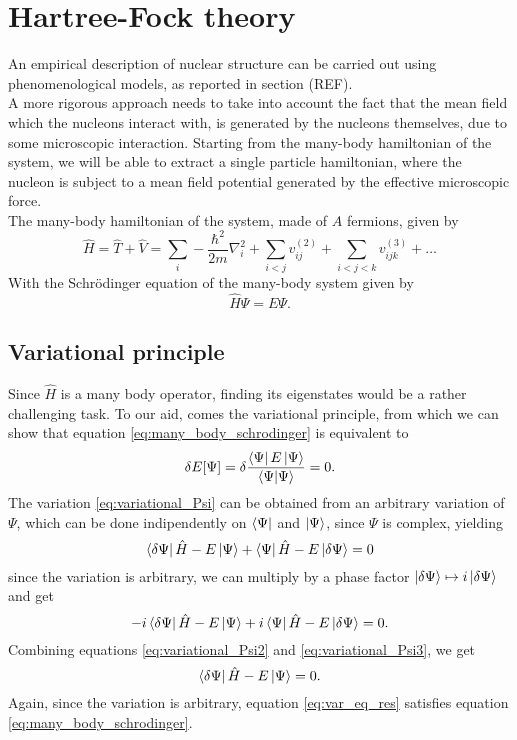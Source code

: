 \section{Hartree-Fock theory}
An empirical description of nuclear structure can be carried out using phenomenological models, as reported in section (REF).
\\A more rigorous approach needs to take into account the fact that the mean field which the nucleons interact with, is generated by the nucleons themselves, due to some microscopic interaction.
Starting from the many-body hamiltonian of the system, we will be able to extract a single particle hamiltonian, where the nucleon is subject to a mean field potential generated by the effective microscopic force.
\\The many-body hamiltonian of the system, made of $A$ fermions, given by
\begin{equation}
    \label{eq:mb_hamiltonian}
    \hat H = \hat T + \hat V = \sum_i -\frac{\hbar^2}{2m}\nabla^2_i + \sum_{i<j} v^{(2)}_{ij} + \sum_{i<j<k} v^{(3)}_{ijk }+\ldots
\end{equation}
With the Schr\"odinger equation of the many-body system given by
\begin{equation}
    \label{eq:many_body_schrodinger}
    \hat H \Psi = E\Psi.
\end{equation}
\subsection{Variational principle}
Since $\hat H$ is a many body operator, finding its eigenstates would be a rather challenging task. To our aid, comes the variational principle, from which we can show that equation \eqref{eq:many_body_schrodinger} is equivalent to 
\begin{equation}
    \label{eq:variational_Psi}
    \delta E[\Psi] = \delta \frac{\bra{\Psi} E \ket{\Psi}}{\bra{\Psi}\ket{\Psi}} = 0.
\end{equation}
The variation \eqref{eq:variational_Psi} can be obtained from an arbitrary variation of $\Psi$, which can be done indipendently on $\bra{\Psi}$ and $\ket{\Psi}$, since $\Psi$ is complex, yielding
\begin{equation}
    \label{eq:variational_Psi2}
    \bra{\delta \Psi} \hat H  -E\ket{\Psi} + \bra{\Psi} \hat H-E \ket{\delta \Psi} = 0
\end{equation}
since the variation is arbitrary, we can multiply by a phase factor $\ket{\delta \Psi}\mapsto i\ket{\delta \Psi}$ and get
\begin{equation}
    \label{eq:variational_Psi3}
    -i\bra{\delta \Psi} \hat H-E \ket{\Psi} + i\bra{\Psi} \hat H-E \ket{\delta \Psi} = 0.
\end{equation}
Combining equations \eqref{eq:variational_Psi2} and \eqref{eq:variational_Psi3}, we get
\begin{equation}
    \label{eq:var_eq_res}
    \bra{\delta \Psi} \hat H-E \ket{\Psi} = 0.
\end{equation}
Again, since the variation is arbitrary, equation \eqref{eq:var_eq_res} satisfies equation \eqref{eq:many_body_schrodinger}.
